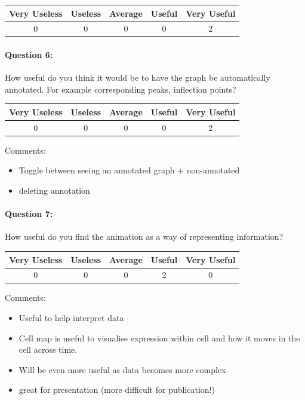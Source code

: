 \begin{center}
\begin{tabular}{ | c | c | c | c | c |}
    \hline
    Very Useless & Useless  & Average & Useful & Very Useful \\
    \hline
    0 & 0 & 0 & 0 & 2 \\
    \hline
\end{tabular}
\end{center}

\paragraph*{Question 6: } How useful do you think it would be to have the graph be automatically annotated.  For example corresponding peaks, inflection points?

\begin{center}
\begin{tabular}{ | c | c | c | c | c |}
    \hline
    Very Useless & Useless  & Average & Useful & Very Useful \\
    \hline
    0 & 0 & 0 & 0 & 2 \\
    \hline
\end{tabular}
\end{center}

Comments:
\begin{itemize}
\item Toggle between seeing an annotated graph + non-annotated
\item deleting annotation
\end{itemize}

\paragraph*{Question 7: } How useful do you find the animation as a way of representing information?

\begin{center}
\begin{tabular}{ | c | c | c | c | c |}
    \hline
    Very Useless & Useless  & Average & Useful & Very Useful \\
    \hline
    0 & 0 & 0 & 2 & 0 \\
    \hline
\end{tabular}
\end{center}

Comments:
\begin{itemize}
\item Useful to help interpret data
\item Cell map is useful to visualise expression within cell and how it moves in the cell across time.
\item Will be even more useful as data becomes more complex
\item great for presentation (more difficult for publication!)
\end{itemize}

